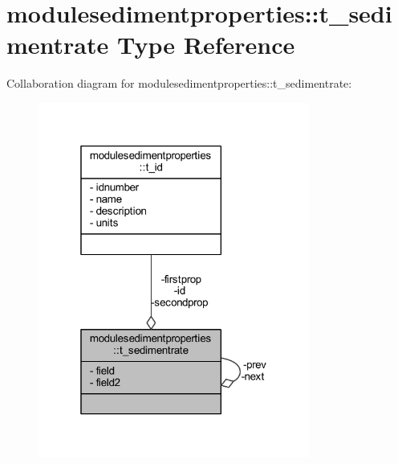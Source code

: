 \hypertarget{structmodulesedimentproperties_1_1t__sedimentrate}{}\section{modulesedimentproperties\+:\+:t\+\_\+sedimentrate Type Reference}
\label{structmodulesedimentproperties_1_1t__sedimentrate}


Collaboration diagram for modulesedimentproperties\+:\+:t\+\_\+sedimentrate\+:\nopagebreak
\begin{figure}[H]
\begin{center}
\leavevmode
\includegraphics[width=253pt]{structmodulesedimentproperties_1_1t__sedimentrate__coll__graph}
\end{center}
\end{figure}
